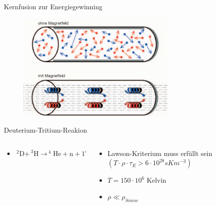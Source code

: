 \documentclass[aspectratio=169,xcolor=dvipsnames,14pt]{beamer}
\begin{document}
\begin{frame}{Kernfusion zur Energiegewinning}
    \begin{figure}
        \centering
        \includegraphics[width=0.7\textwidth]{Images/PlasmaImMagnetfeld.png}
    \end{figure}
\end{frame}
    
    \begin{frame}{Deuterium-Tritium-Reakion}
        \begin{columns}
            \begin{column}{0.7\textwidth}
                \begin{itemize}
                    \color{LightGrey}
                    \item
                    \begin{math} 
                            {\displaystyle \mathrm {_{\ }^{\ 2}D+_{\ }^{\ 3}H\to _{\ }^{\ 4}He+n + 17.58 \ MeV}}
                    \end{math}
                \end{itemize}
            \end{column}

            \begin{column}{0.3\textwidth}
                \begin{itemize}
                \color{LightGrey}
                    \item Lawson-Kriterium muss erfüllt sein $(T\cdot\rho\cdot\tau _{E} > 6\cdot{10}^{28}sK{m}^{-3})$
                    \item $T = 150\cdot{10}^{6}$ Kelvin
                    \item $\rho \ll \rho_{Sonne}$
                \end{itemize}
            \end{column}

        \end{columns}
    \end{frame}
\end{document}
